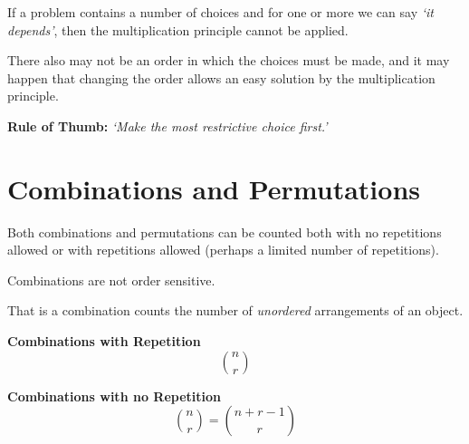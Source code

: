 \documentclass{article}
\begin{document}
 
\begin{tcolorbox}[title={PST: Restricted Choices First},colback={white},colframe={black},sharp corners,colbacktitle={white},coltitle={black},fonttitle=\bfseries,subtitle style={boxrule=0.4pt,colback=white}]

If a problem contains a number of choices and for one or more we can say \emph{`it depends'}, then the multiplication principle cannot be applied. 

\tcblower
There also may not be an order in which the choices must be made, and it may happen that changing the order allows an easy solution by the multiplication principle.

\tcbline

\textbf{Rule of Thumb:} \textit{`Make the most restrictive choice first.'} 
\end{tcolorbox}

\section{Combinations and Permutations}

Both combinations and permutations can be counted both with no repetitions allowed or with repetitions allowed (perhaps a limited number of repetitions). 

\begin{tcolorbox}[title={Combinations}, colback={white},colframe={black},sharp corners,colbacktitle={white},coltitle={black},fonttitle=\bfseries,subtitle style={boxrule=0.4pt,colback=white}]
		
Combinations are not order sensitive. 

That is a combination counts the number of \emph{unordered} arrangements of an object. 
\tcblower

\small \textbf{Combinations with Repetition} 
\[\binom{n}{r}\]

\tcbline 
\small \textbf{Combinations with no Repetition} 
\[\binom{n}{r} = \binom{n+r-1}{r}\]
\end{tcolorbox}

 
\end{document}
